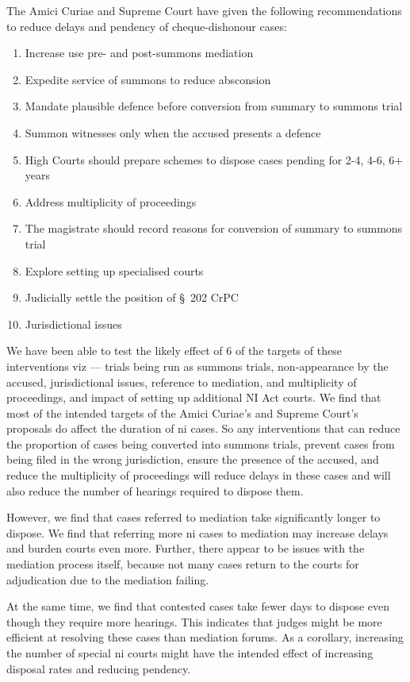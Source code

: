 The Amici Curiae and Supreme Court have given the following recommendations to reduce delays and pendency of cheque-dishonour cases:
\begin{enumerate}
\item Increase use pre- and post-summons mediation
\item Expedite service of summons to reduce absconsion
\item Mandate plausible defence before conversion from summary to summons trial
\item Summon witnesses only when the accused presents a defence
\item High Courts should prepare schemes to dispose cases pending for 2-4, 4-6, 6+ years
\item Address multiplicity of proceedings
\item The magistrate should record reasons for conversion of summary to summons trial
\item Explore setting up specialised courts
\item Judicially settle the position of \S~202 CrPC
\item Jurisdictional issues
\end{enumerate}

We have been able to test the likely effect of 6 of the targets of these interventions viz --- trials being run as summons trials, non-appearance by the accused, jurisdictional issues, reference to mediation, and multiplicity of proceedings, and impact of setting up additional NI Act courts. We find that most of the intended targets of the Amici Curiae's and Supreme Court's proposals do affect the duration of \gls{ni} cases. So any interventions that can reduce the proportion of cases being converted into summons trials, prevent cases from being filed in the wrong jurisdiction, ensure the presence of the accused, and reduce the multiplicity of proceedings will reduce delays in these cases and will also reduce the number of hearings required to dispose them.

However, we find that cases referred to mediation take significantly longer to dispose. We find that referring more \gls{ni} cases to mediation may increase delays and burden courts even more. Further, there appear to be issues with the mediation process itself, because not many cases return to the courts for adjudication due to the mediation failing.

At the same time, we find that contested cases take fewer days to dispose even though they require more hearings. This indicates that judges might be more efficient at resolving these cases than mediation forums. As a corollary, increasing the number of special \gls{ni} courts might have the intended effect of increasing disposal rates and reducing pendency.

